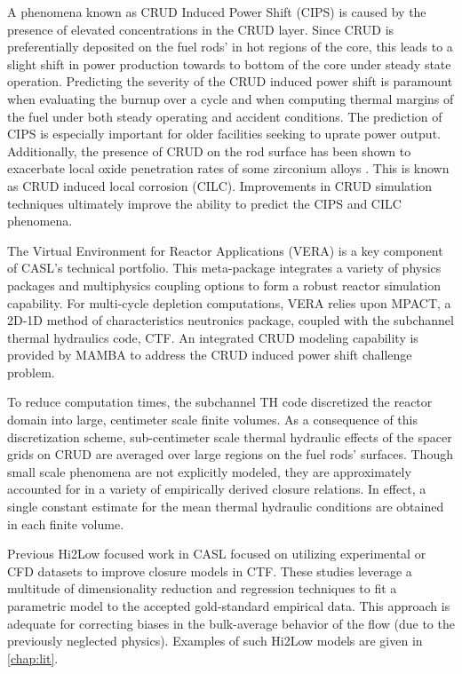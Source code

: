 A phenomena known as CRUD Induced Power Shift (CIPS) is caused by the presence
of elevated  concentrations in the CRUD layer.  Since CRUD is preferentially
deposited on the fuel rods' in hot regions of the core, this leads to a slight shift in
power production towards to bottom of the core under steady state operation.  Predicting the severity of the
CRUD induced power shift is paramount when evaluating the burnup over a cycle
and when computing thermal
margins of the fuel under both steady operating and accident conditions.  The prediction
of CIPS is especially important for older facilities seeking to uprate power
output.  Additionally, the presence of CRUD on the rod surface has been shown
to exacerbate local oxide penetration rates of some zirconium alloys \cite{adamson07}.
This is known as CRUD induced local corrosion (CILC).  Improvements in CRUD
simulation techniques ultimately improve the ability to predict the CIPS and
CILC phenomena.

The Virtual Environment for Reactor Applications (VERA) is a key component of
CASL's technical portfolio.  This meta-package integrates a variety of physics
packages and multiphysics coupling options to form a robust reactor simulation
capability.  For multi-cycle depletion computations, VERA relies upon MPACT, a
2D-1D method of characteristics neutronics package, coupled with the subchannel
thermal hydraulics code, CTF.  An integrated CRUD modeling capability
is provided by MAMBA to address the CRUD induced power shift challenge problem.

To reduce computation times, the subchannel TH code discretized the reactor
domain into large, centimeter scale finite volumes. As a consequence of this
discretization scheme, sub-centimeter scale thermal hydraulic effects of the
spacer grids on CRUD are averaged over large regions on the fuel rods'
surfaces.  Though small scale phenomena are not explicitly modeled, they are
approximately accounted for in a variety of empirically derived closure
relations.  In effect, a single constant estimate for the mean thermal
hydraulic conditions are obtained in each finite volume.

Previous Hi2Low focused work in CASL focused on utilizing experimental or CFD
datasets to improve closure models in CTF.  These studies leverage a multitude
of dimensionality reduction and regression techniques to fit a parametric model
to the accepted gold-standard empirical data.  This approach is adequate for
correcting biases in the bulk-average behavior of the flow (due to the
previously neglected physics).  Examples of such Hi2Low models are given in
\autoref{chap:lit}.

